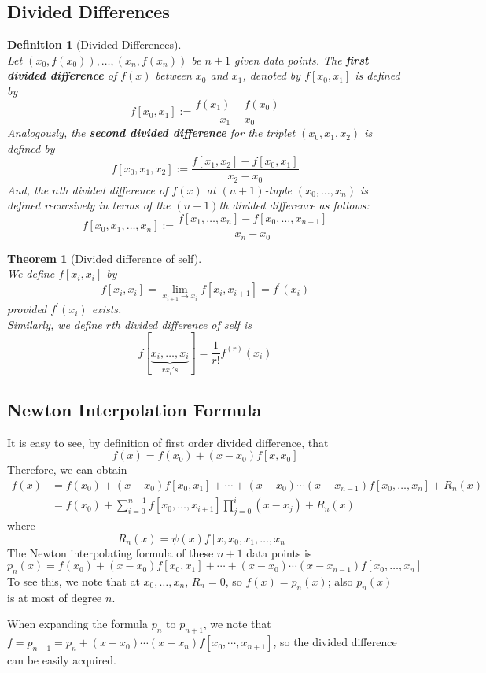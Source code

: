 \documentclass[12pt]{article}
\newtheorem{definition}{Definition}[section]
\newtheorem{theorem}{Theorem}[section]
\theoremstyle{definition}
\begin{document}
\subsection{Divided Differences}
\begin{definition}[Divided Differences]
\hfill\\\normalfont Let $(x_0,f(x_0)), \ldots, (x_n,f(x_n))$ be $n+1$ given data points. The \textbf{first divided difference} of $f(x)$ between $x_0$ and $x_1$, denoted by $f[x_0,x_1]$ is defined by
\[
f[x_0,x_1]:=\frac{f(x_1)-f(x_0)}{x_1-x_0}
\]
Analogously, the \textbf{second divided difference} for the triplet $(x_0,x_1,x_2)$ is defined by
\[
f[x_0,x_1,x_2]:=\frac{f[x_1,x_2]-f[x_0,x_1]}{x_2-x_0}
\]
And, the $n$th divided difference of $f(x)$ at $(n+1)$-tuple $(x_0,\ldots, x_n)$ is defined recursively in terms of the $(n-1)$th divided difference as follows:
\[
f[x_0,x_1,\ldots, x_n]:=\frac{f[x_1,\ldots, x_n]-f[x_0,\ldots, x_{n-1}]}{x_n-x_0}
\]
\end{definition}
\begin{theorem}[Divided difference of self]
\hfill\\\normalfont We define $f[x_i,x_i]$ by
\[
f[x_i,x_i] = \lim_{x_{i+1}\to x_i}f[x_i,x_{i+1}] = f^\prime(x_i)
\]
provided $f^\prime(x_i)$ exists.\\
Similarly, we define $r$th divided difference of self is
\[
f[\underbrace{x_i,\ldots, x_i}_{r x_i's}] = \frac{1}{r!}f^{(r)}(x_i)
\]
\end{theorem}
\subsection{Newton Interpolation Formula}
It is easy to see, by definition of first order divided difference, that
\[
f(x) = f(x_0)+(x-x_0)f[x,x_0]
\]
Therefore, we can obtain
\begin{align*}
f(x) &= f(x_0)+(x-x_0)f[x_0,x_1]+\cdots +(x-x_0)\cdots(x-x_{n-1})f[x_0,\ldots, x_n]+R_n(x)\\
&=f(x_0)+\sum_{i=0}^{n-1}f[x_0,\ldots, x_{i+1}]\prod_{j=0}^i (x-x_j)+R_n(x)
\end{align*}
where
\[
R_n(x) = \psi(x)f[x,x_0,x_1,\ldots, x_n]
\]
The Newton interpolating formula of these $n+1$ data points is 
\[
p_n(x) = f(x_0)+(x-x_0)f[x_0,x_1]+\cdots +(x-x_0)\cdots(x-x_{n-1})f[x_0,\ldots, x_n]
\]
To see this, we note that at $x_0, \ldots, x_n$, $R_n=0$, so $f(x) = p_n(x)$; also $p_n(x)$ is at most of degree $n$.

When expanding the formula $p_n$ to $p_{n+1}$, we note that $f = p_{n+1} = p_n + (x-x_0)\cdots(x-x_n)f[x_0,\cdots, x_{n+1}]$, so the divided difference can be easily acquired.\\
\end{document}
